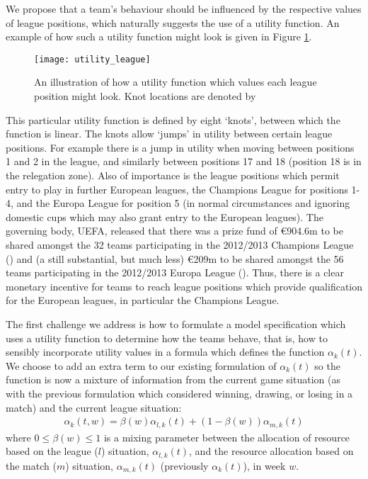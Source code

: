 We propose that a team's behaviour should be influenced by the respective values of league positions, which naturally
suggests the use of a utility function. An example of how such a utility function might look is given in Figure
\ref{fig:utility_league}.
\begin{figure}[htp]
\begin{center}
\texttt{[image: utility\_league]} 
\caption{An illustration of how a utility function which values each league position might look. Knot locations are
denoted by \protect\blackFilledCircle}
\label{fig:utility_league}
\end{center}
\end{figure}
This particular utility function is defined by eight `knots', between which the function is linear. The knots allow
`jumps' in utility between certain league positions. For example there is a jump in utility when moving between
positions 1 and 2 in the league, and similarly between positions 17 and 18 (position 18 is in the relegation zone). Also
of importance is the league positions which permit entry to play in further European leagues, the Champions League for
positions 1-4, and the Europa League for position 5 (in normal circumstances and ignoring domestic cups which may also
grant entry to the European leagues). The governing body, UEFA, released that there was a prize fund of \euro904.6m to
be shared amongst the 32 teams participating in the 2012/2013 Champions League (\cite{championsLeagueMoney}) and (a
still substantial, but much less) \euro209m to be shared amongst the 56 teams participating in the 2012/2013 Europa
League (\cite{europaLeagueMoney}). Thus, there is a clear monetary incentive for teams to reach league positions which
provide qualification for the European leagues, in particular the Champions League.

The first challenge we address is how to formulate a model specification which uses a utility function to determine how
the teams behave, that is, how to sensibly incorporate utility values in a formula which defines the function
\(\alpha_k(t)\). We choose to add an extra term to our existing formulation of \(\alpha_k(t)\) so the function is now a
mixture of information from the current game situation (as with the previous formulation which considered winning,
drawing, or losing in a match) and the current league situation:
\begin{align} 
\alpha_k(t, w) = \beta(w) \alpha_{l, k}(t) + (1 - \beta(w)) \alpha_{m, k}(t)
\end{align}
where \(0 \leq \beta(w) \leq 1\) is a mixing parameter between the allocation of resource based on the league (\(l\))
situation, \(\alpha_{l, k}(t)\), and the resource allocation based on the match (\(m\)) situation, \(\alpha_{m, k}(t)\)
(previously \(\alpha_k(t)\)), in week \(w\). 

